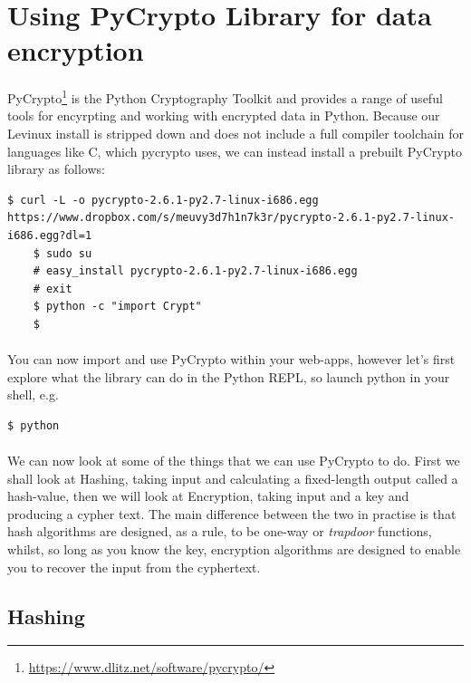 \documentclass[12pt, a4paper, twoside]{book}
\begin{document}
\section{Using PyCrypto Library for data encryption}
\label{pycrypto}
\paragraph{} PyCrypto\footnote{\url{https://www.dlitz.net/software/pycrypto/}} is the Python Cryptography Toolkit and provides a range of useful tools for encyrpting and working with encrypted data in Python. Because our Levinux install is stripped down and does not include a full compiler toolchain for languages like C, which pycrypto uses, we can instead install a prebuilt PyCrypto library as follows:

\begin{lstlisting}[style=DOS]
    $ curl -L -o pycrypto-2.6.1-py2.7-linux-i686.egg https://www.dropbox.com/s/meuvy3d7h1n7k3r/pycrypto-2.6.1-py2.7-linux-i686.egg?dl=1
    $ sudo su
    # easy_install pycrypto-2.6.1-py2.7-linux-i686.egg
    # exit
    $ python -c "import Crypt"
    $
\end{lstlisting}

\paragraph{} You can now import and use PyCrypto within your web-apps, however let's first explore what the library can do in the Python REPL, so launch python in your shell, e.g.

\begin{lstlisting}[style=DOS]
    $ python
\end{lstlisting}

\paragraph{} We can now look at some of the things that we can use PyCrypto to do. First we shall look at Hashing, taking input and calculating a fixed-length output called a hash-value, then we will look at Encryption, taking input and a key and producing a cypher text. The main difference between the two in practise is that hash algorithms are designed, as a rule, to be one-way or \emph{trapdoor} functions, whilst, so long as you know the key, encryption algorithms are designed to enable you to recover the input from the cyphertext.

\subsection{Hashing}
\end{document}
